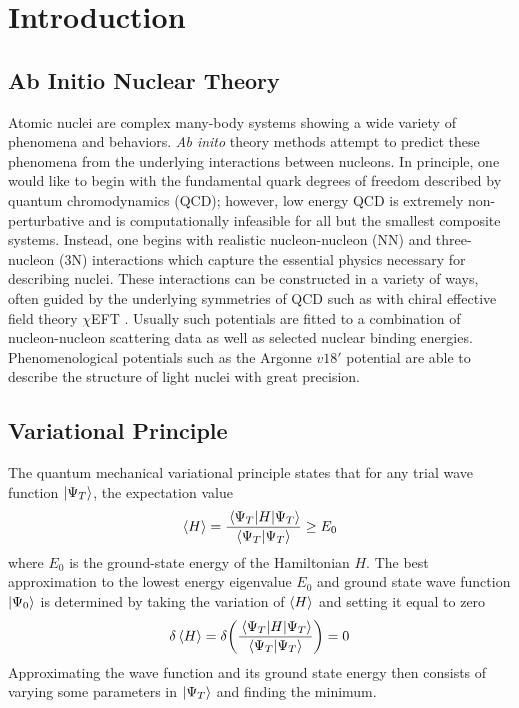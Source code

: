 \documentclass[aps,prl,preprint,groupedaddress]{revtex4-1}
\begin{document}
\section{Introduction}
\subsection{Ab Initio Nuclear Theory}

Atomic nuclei are complex many-body systems showing a wide variety of phenomena
and behaviors. \textit{Ab inito} theory methods attempt to predict these phenomena
from the underlying interactions between nucleons. In principle, one would like
to begin with the fundamental quark degrees of freedom described by quantum
chromodynamics (QCD); however, low energy QCD is extremely non-perturbative and
is computationally infeasible for all but the smallest composite systems. Instead,
one begins with realistic nucleon-nucleon (NN) and three-nucleon (3N) interactions
which capture the essential physics necessary for describing nuclei. These interactions
can be constructed in a variety of ways, often guided by the underlying symmetries
of QCD such as with chiral effective field theory \(\chi\)EFT \cite{RevModPhys.87.1067}.
Usually such potentials are fitted to a combination of nucleon-nucleon scattering
data as well as selected nuclear binding energies. Phenomenological potentials
such as the Argonne \(v18'\) potential are able to describe the structure of light
nuclei with great precision.

\subsection{Variational Principle}
The quantum mechanical variational principle states that for any trial wave function
\(\ket{\Psi_T}\), the expectation value
\[\ev{H} = \frac{\ev{H}{\Psi_T}}{\braket{\Psi_T}} \geq E_0\]
where \(E_0\) is the ground-state energy of the Hamiltonian \(H\). The best approximation
to the lowest energy eigenvalue \(E_0\) and ground state wave function \(\ket{\Psi_0}\)
is determined by taking the variation of \(\ev{H}\) and setting it equal to zero
\[\delta \ev{H} = \delta \qty(\frac{\ev{H}{\Psi_T}}{\braket{\Psi_T}}) = 0\]
Approximating the wave function and its ground state energy then consists of varying
some parameters in \(\ket{\Psi_T}\) and finding the minimum.
\end{document}
